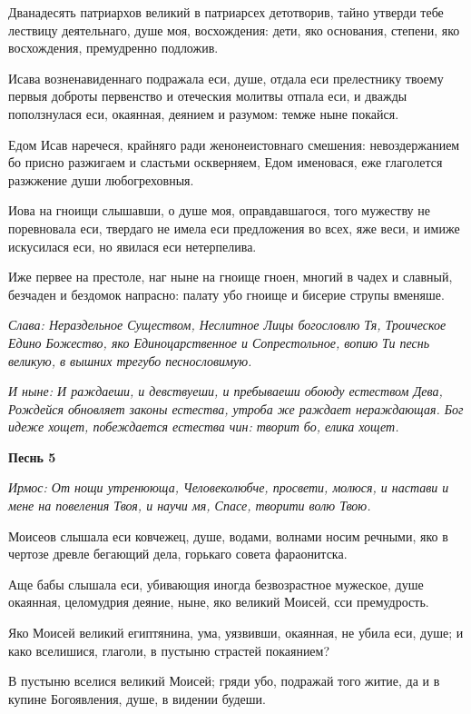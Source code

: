 Дванадесять патриархов великий в патриарсех детотворив, тайно утверди тебе лествицу деятельнаго, душе моя, восхождения: дети, яко основания, степени, яко восхождения, премудренно подложив. 

Исава возненавиденнаго подражала еси, душе, отдала еси прелестнику твоему первыя доброты первенство и отеческия молитвы отпала еси, и дважды поползнулася еси, окаянная, деянием и разумом: темже ныне покайся. 

Едом Исав наречеся, крайняго ради женонеистовнаго смешения: невоздержанием бо присно разжигаем и сластьми оскверняем, Едом именовася, еже глаголется разжжение души любогреховныя. 

Иова на гноищи слышавши, о душе моя, оправдавшагося, того мужеству не поревновала еси, твердаго не имела еси предложения во всех, яже веси, и имиже искусилася еси, но явилася еси нетерпелива. 

Иже первее на престоле, наг ныне на гноище гноен, многий в чадех и славный, безчаден и бездомок напрасно: палату убо гноище и бисерие струпы вменяше. 

\itshape Слава\normalfont{}: Нераздельное Существом, Неслитное Лицы богословлю Тя, Троическое Едино Божество, яко Единоцарственное и Сопрестольное, вопию Ти песнь великую, в вышних трегубо песнословимую. 

\itshape И ныне\normalfont{}: И раждаеши, и девствуеши, и пребываеши обоюду естеством Дева, Рождейся обновляет законы естества, утроба же раждает нераждающая. Бог идеже хощет, побеждается естества чин: творит бо, елика хощет. 

\medskip\bfseries Песнь 5\normalfont{}

\itshape Ирмос\normalfont{}: От нощи утренююща, Человеколюбче, просвети, молюся, и настави и мене на повеления Твоя, и научи мя, Спасе, творити волю Твою. 

Моисеов слышала еси ковчежец, душе, водами, волнами носим речными, яко в чертозе древле бегающий дела, горькаго совета фараонитска. 

Аще бабы слышала еси, убивающия иногда безвозрастное мужеское, душе окаянная, целомудрия деяние, ныне, яко великий Моисей, сси премудрость. 

Яко Моисей великий египтянина, ума, уязвивши, окаянная, не убила еси, душе; и како вселишися, глаголи, в пустыню страстей покаянием? 

В пустыню вселися великий Моисей; гряди убо, подражай того житие, да и в купине Богоявления, душе, в видении будеши. 


